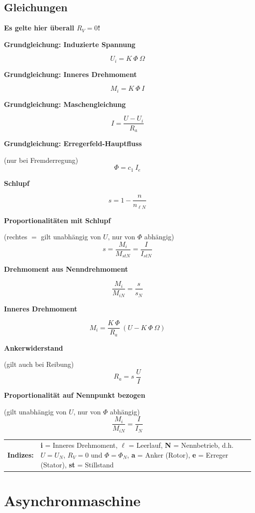 \documentclass[11pt]{article}
\newcommand{\fancythumb}[2]{
	\addthumb{#1}{\large\sffamily\textbf{\space\space#1\vspace{5pt}}}{white}{#2}
}
\newcommand{\fancyformula}[2]{
	\small
	\raggedright\sffamily\textbf{#1}
	#2
}
\begin{document}
\subsection*{Gleichungen}
\textbf{Es gelte hier überall $R_V = 0$!}

\begin{multicols}{2}
\fancyformula{Grundgleichung: Induzierte Spannung}{
	\[
		U_i = K ~ \Phi ~ \Omega
	\]
}

\fancyformula{Grundgleichung: Inneres Drehmoment}{
	\[
		M_i = K ~ \Phi ~ I
	\]
}

\fancyformula{Grundgleichung: Maschengleichung}{
	\[
		I = \frac{U - U_i}{R_a}
	\]
}

\fancyformula{Grundgleichung: Erregerfeld-Hauptfluss}{
	(nur bei Fremderregung)
	\[
		\Phi = c_1 ~ I_e
	\]
}

\fancyformula{Schlupf}{
	\[
		s = 1 - \frac{n}{n_{\ell N}}
	\]
}

\fancyformula{Proportionalitäten mit Schlupf}{
	(rechtes $=$ gilt unabhängig von $U$, nur von $\Phi$ abhängig)
	\[
		s = \frac{M_i}{M_{stN}} = \frac{I}{I_{stN}}
	\]
}

\fancyformula{Drehmoment aus Nenndrehmoment}{
	\[
		\frac{M_i}{M_{iN}} = \frac{s}{s_N}
	\]
}

\fancyformula{Inneres Drehmoment}{
	\[
		M_i = \frac{K ~ \Phi}{R_a} ~ (U - K ~ \Phi ~ \Omega)
	\]
}

\fancyformula{Ankerwiderstand}{
	(gilt auch bei Reibung)
	\[
		R_a = s ~ \frac{U}{I}
	\]
}

\fancyformula{Proportionalität auf Nennpunkt bezogen}{
	(gilt unabhängig von $U$, nur von $\Phi$ abhängig)
	\[
		\frac{M_i}{M_{iN}} = \frac{I}{I_N}
	\]
}
\end{multicols}

\raggedright
\vspace{12pt}
\footnotesize
\begin{tabular}{r p{13cm}}
	\sffamily\textbf{Indizes:} & \rmfamily \textbf{i} = Inneres Drehmoment, \textbf{$\ell$} = Leerlauf, \textbf{N} = Nennbetrieb, d.h. $U = U_N$, $R_V = 0$ und $\Phi = \Phi_N$, \textbf{a} = Anker (Rotor), \textbf{e} = Erreger (Stator), \textbf{st} = Stillstand
\end{tabular}
\normalsize


\newpage
\section*{Asynchronmaschine}
\fancythumb{ASM}{red}
\end{document}
